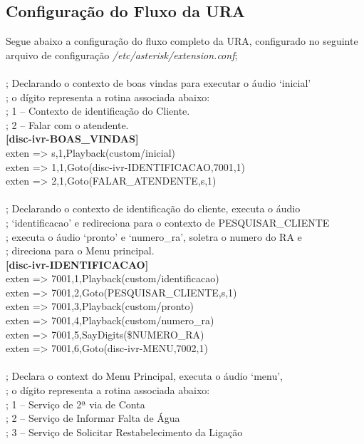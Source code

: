 \begin{apendicesenv}
\chapter{Configuração do Fluxo da URA}
Segue abaixo a configuração do fluxo completo da URA, configurado no seguinte arquivo de configuração \textit{/etc/asterisk/extension.conf};
\\\\
; Declarando o contexto de boas vindas para executar o áudio ‘inicial’ \\
; o dígito representa a rotina associada abaixo: \\
; 1 – Contexto de identificação do Cliente. \\
; 2 – Falar com o atendente. \\
\textbf{[disc-ivr-BOAS\_VINDAS] }	 \\
exten => s,1,Playback(custom/inicial)  \\
exten => 1,1,Goto(disc-ivr-IDENTIFICACAO,7001,1)  \\
exten => 2,1,Goto(FALAR\_ATENDENTE,s,1)  \\
 \\
; Declarando o contexto de identificação do cliente, executa o áudio  \\
; ‘identificacao’ e redireciona para o contexto de PESQUISAR\_CLIENTE \\
; executa o áudio ‘pronto’ e ‘numero\_ra’, soletra o numero do RA e  \\
; direciona para o Menu principal. \\
\textbf{[disc-ivr-IDENTIFICACAO]} \\
exten => 7001,1,Playback(custom/identificacao) \\
exten => 7001,2,Goto(PESQUISAR\_CLIENTE,s,1) \\
exten => 7001,3,Playback(custom/pronto) \\
exten => 7001,4,Playback(custom/numero\_ra) \\
exten => 7001,5,SayDigits(\${NUMERO\_RA}) \\
exten => 7001,6,Goto(disc-ivr-MENU,7002,1) \\
 \\
; Declara o context do Menu Principal, executa o áudio ‘menu’, \\
; o dígito representa a rotina associada abaixo: \\
; 1 – Serviço de 2ª via de Conta \\
; 2 – Serviço de Informar Falta de Água \\
; 3 – Serviço de Solicitar Restabelecimento da Ligação \\

\end{apendicesenv}
